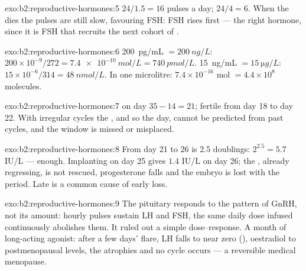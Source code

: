 \begin{solution}{exo:b2:reproductive-hormones:5}
$24/1.5 = 16$ pulses a day; $24/4 = 6$. When the  dies
the pulses are still slow, favouring FSH: FSH rises first --- the
right hormone, since it is FSH that recruits the next cohort of
.
\end{solution}

\begin{solution}{exo:b2:reproductive-hormones:6}
\qty{200}{pg/mL} $= \qty{200}{ng/L}$: $200\times 10^{-9}/272 =
\qty{7.4e-10}{mol/L} = \qty{740}{pmol/L}$. \qty{15}{ng/mL} $=
\qty{15}{\micro g/L}$: $15\times 10^{-6}/314 = \qty{48}{nmol/L}$. In
one microlitre: $7.4\times 10^{-16}$ mol $= 4.4\times 10^{8}$
molecules.
\end{solution}

\begin{solution}{exo:b2:reproductive-hormones:7}
 on day $35 - 14 = 21$; fertile from day 18 to day 22. With
irregular cycles the , and so the  day,
cannot be predicted from past cycles, and the window is missed or
misplaced.
\end{solution}

\begin{solution}{exo:b2:reproductive-hormones:8}
From day 21 to 26 is 2.5 doublings: $2^{2.5} = 5.7$ IU/L --- enough.
Implanting on day 25 gives $1.4$ IU/L on day 26; the ,
already regressing, is not rescued, progesterone falls and the
embryo is lost with the period. Late  is a common cause
of early loss.
\end{solution}

\begin{solution}{exo:b2:reproductive-hormones:9}
The pituitary responds to the pattern of GnRH, not its amount:
hourly pulses sustain LH and FSH, the same daily dose infused
continuously abolishes them. It ruled out a simple dose--response.
A month of long-acting agonist: after a few days' flare, LH falls to
near zero (), oestradiol to postmenopausal
levels, the  atrophies and no cycle occurs --- a
reversible medical menopause.
\end{solution}

